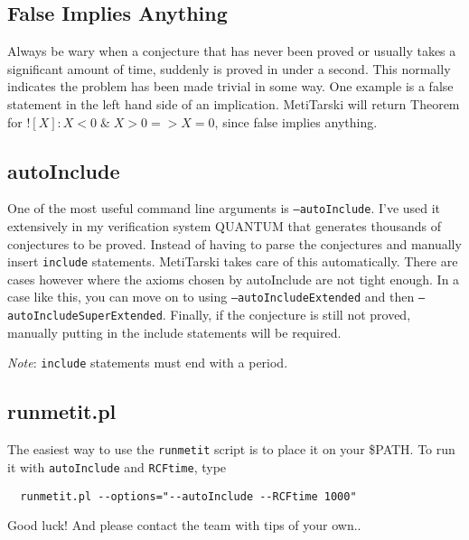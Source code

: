 \documentclass[11pt]{article}   	%
\begin{document}
\subsection{False Implies Anything}

Always be wary when a conjecture that has never been proved or usually takes a
significant amount of time, suddenly is proved in under a second. This normally
indicates the problem has been made trivial in some way. One example is a false
statement in the left hand side of an implication. MetiTarski will return
Theorem for $![X] : X<0 \; \& \; X>0 => X=0$, since false implies anything.

\subsection{autoInclude}

One of the most useful command line arguments is \texttt{--autoInclude}. I've used it
extensively in my verification system QUANTUM that generates thousands of
conjectures to be proved. Instead of having to parse the conjectures and
manually insert \texttt{include} statements. MetiTarski takes care of this
automatically. There are cases however where the axioms chosen by autoInclude
are not tight enough. In a case like this, you can move on to using
\texttt{--autoIncludeExtended} and then \texttt{--autoIncludeSuperExtended}. Finally, if
the conjecture is still not proved, manually putting in the include statements
will be required.

\textit{Note}:  \texttt{include} statements must end with a period.


\subsection{runmetit.pl}

The easiest way to use the \texttt{runmetit} script is to place it on your \$PATH. To run
it with \texttt{autoInclude} and \texttt{RCFtime}, type

\begin{verbatim}
  runmetit.pl --options="--autoInclude --RCFtime 1000"
\end{verbatim}

Good luck! And please contact the team with tips of your own..
\end{document}
